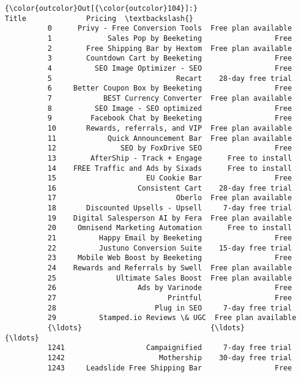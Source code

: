 \documentclass[11pt]{article}
\begin{document}
\begin{Verbatim}[commandchars=\\\{\}]
{\color{outcolor}Out[{\color{outcolor}104}]:}                                Title              Pricing  \textbackslash{}
          0      Privy - Free Conversion Tools  Free plan available   
          1             Sales Pop by Beeketing                 Free   
          2        Free Shipping Bar by Hextom  Free plan available   
          3        Countdown Cart by Beeketing                 Free   
          4          SEO Image Optimizer - SEO                 Free   
          5                             Recart    28-day free trial   
          6     Better Coupon Box by Beeketing                 Free   
          7            BEST Currency Converter  Free plan available   
          8          SEO Image - SEO optimized                 Free   
          9         Facebook Chat by Beeketing                 Free   
          10       Rewards, referrals, and VIP  Free plan available   
          11            Quick Announcement Bar  Free plan available   
          12               SEO by FoxDrive SEO                 Free   
          13        AfterShip - Track + Engage      Free to install   
          14    FREE Traffic and Ads by Sixads      Free to install   
          15                     EU Cookie Bar                 Free   
          16                   Consistent Cart    28-day free trial   
          17                            Oberlo  Free plan available   
          18       Discounted Upsells - Upsell     7-day free trial   
          19    Digital Salesperson AI by Fera  Free plan available   
          20     Omnisend Marketing Automation      Free to install   
          21          Happy Email by Beeketing                 Free   
          22          Justuno Conversion Suite    15-day free trial   
          23     Mobile Web Boost by Beeketing                 Free   
          24    Rewards and Referrals by Swell  Free plan available   
          25              Ultimate Sales Boost  Free plan available   
          26                   Ads by Varinode                 Free   
          27                          Printful                 Free   
          28                       Plug in SEO     7-day free trial   
          29          Stamped.io Reviews \& UGC  Free plan available   
          {\ldots}                              {\ldots}                  {\ldots}   
          1241                   Campaignified     7-day free trial   
          1242                      Mothership    30-day free trial   
          1243     Leadslide Free Shipping Bar                 Free   

\end{Verbatim}
\end{document}
